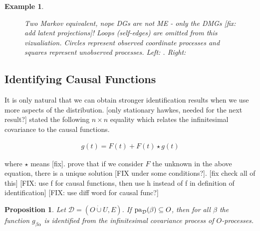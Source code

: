 \documentclass[accepted]{uai2021} %
\newtheorem{exmp}[thm]{Example}
\newtheorem{prop}[thm]{Proposition}
\newcommand{\pa}{\textnormal{pa}}
\newcommand{\disjU}{\mathbin{\dot{\cup}}}
\begin{document}
\begin{exmp}
\begin{figure*}
\begin{subfigure}{0.48\linewidth}
			\end{subfigure}
			\caption{\label{fig:cyclicDGs} Two Markov equivalent, nope DGs are 
			not ME - only the DMGs [fix: add latent projections]! Loops 
			(self-edges) are omitted from 
			this 
				vizualiation. Circles represent observed coordinate processes 
				and 
				squares represent unobserved processes. Left: . Right: }
		\end{figure*}
\end{exmp}



\subsection{Identifying Causal Functions}

It is only natural that we can obtain stronger identification results when we 
use more aspects of the distribution. [only stationary hawkes, needed for the 
next result?] \cite{hawkesJRSSB1971} stated the following $n\times n$ equality 
which 
relates the infinitesimal covariance to the causal functions.

\begin{align}
	g(t) = F(t) + F(t) \star g(t)
	\label{eq:covCauFunc}
\end{align}

where $\star$ means [fix]. \cite{bacry2016} prove that if we consider $F$ the 
unknown in the above equation, there is a unique solution [FIX under some 
conditions?]. [fix check all of 
this] [FIX: use f for causal functions, then use h instead of f in definition 
of identification] [FIX: use diff word for causal func?]

\begin{prop}
	Let $\mathcal{D} = (O\disjU U, E)$. If $\pa_\mathcal{D}(\beta) \subseteq 
	O$, then for all $\beta$ the function $g_{\beta\alpha}$ is identified from 
	the infinitesimal covariance process of $O$-processes.
	\label{prop:gPaId}
\end{prop}
\end{document}
